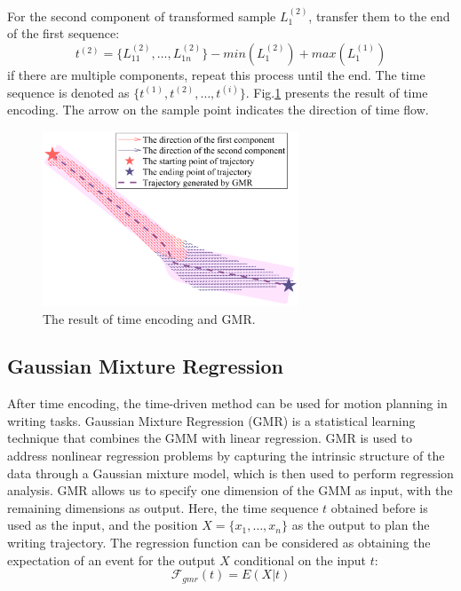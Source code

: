 \documentclass[journal]{IEEEtran}
\begin{document}
For the second component of transformed sample $L_{1}^{(2)}$, transfer them to the end of the first sequence:
\begin{equation}
    t^{(2)}=\{L_{11}^{(2)}, \hdots, L_{1n}^{(2)}\}-min(L_{1}^{(2)})+max(L_{1}^{(1)})
\end{equation}
if there are multiple components, repeat this process until the end. The time sequence is denoted as $\{t^{(1)},t^{(2)},\hdots,t^{(i)}\}$. Fig.\ref{fig4} presents the result of time encoding. The arrow on the sample point indicates the direction of time flow.
\begin{figure}[!t]
    \centering
    \includegraphics[width=3in]{./fig/fig4.pdf}
    \caption{The result of time encoding and GMR.}
    \label{fig4}
\end{figure}

\subsection{Gaussian Mixture Regression}
After time encoding, the time-driven method can be used for motion planning in writing tasks. Gaussian Mixture Regression (GMR) is a statistical learning technique that combines the GMM with linear regression. GMR is used to address nonlinear regression problems by capturing the intrinsic structure of the data through a Gaussian mixture model, which is then used to perform regression analysis. GMR allows us to specify one dimension of the GMM as input, with the remaining dimensions as output. Here, the time sequence $t$ obtained before is used as the input, and the position $X=\{x_1,\hdots,x_n\}$ as the output to plan the writing trajectory. The regression function can be considered as obtaining the expectation of an event for the output $X$ conditional on the input $t$:
\begin{equation}
    \mathcal{F} _{gmr}(t)=E(X|t)
\end{equation}
\end{document}
